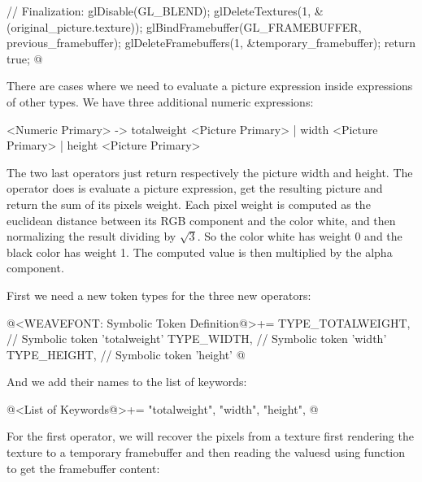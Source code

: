 {{{{{{  // Finalization:
  glDisable(GL_BLEND);
  glDeleteTextures(1, &(original_picture.texture));
  glBindFramebuffer(GL_FRAMEBUFFER, previous_framebuffer);
  glDeleteFramebuffers(1, &temporary_framebuffer);
  return true;
}
@
\fimcodigo


There are cases where we need to evaluate a picture expression inside
expressions of other types. We have three additional numeric
expressions:

\alinhaverbatim
<Numeric Primary> -> totalweight <Picture Primary> |
                     width <Picture Primary> |
                     height <Picture Primary>
\alinhanormal

The two last operators just return respectively the picture width and
height. The operator  does is evaluate a
picture expression, get the resulting picture and return the sum of
its pixels weight. Each pixel weight is computed as the euclidean
distance between its RGB component and the color white, and then
normalizing the result dividing by $\sqrt{3}$. So the color white has
weight 0 and the black color has weight 1. The computed value is then
multiplied by the alpha component.

First we need a new token types for the three new operators:

\iniciocodigo
@<WEAVEFONT: Symbolic Token Definition@>+=
TYPE_TOTALWEIGHT,        // Symbolic token 'totalweight'
TYPE_WIDTH,              // Symbolic token 'width'
TYPE_HEIGHT,             // Symbolic token 'height'
@
\fimcodigo

And we add their names to the list of keywords:

\iniciocodigo
@<List of Keywords@>+=
"totalweight", "width", "height",
@
\fimcodigo

For the first operator, we will recover the pixels from a texture
first rendering the texture to a temporary framebuffer and then
reading the valuesd using function  to get
the framebuffer content:

}}}}}
